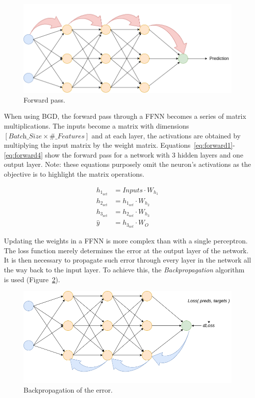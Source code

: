 \begin{figure}[!htbp]
    \centering
    \includegraphics[width=.5\textwidth]{Images/forward_pass.png}
    \caption{Forward pass.}
    \label{fig:forward}
\end{figure}

When using BGD, the forward pass through a FFNN becomes a series of matrix
multiplications. The inputs become a matrix with dimensions $[\textit{Batch\_Size} \times
\textit{\#\_Features}]$ and at each layer, the activations are obtained by multiplying
the input matrix by the weight matrix.
Equations~\ref{eq:forward1}-\ref{eq:forward4} show the forward pass for a
network with 3 hidden layers and one output layer. Note: these equations
purposely omit the neuron's activations as the objective is to highlight the
matrix operations.

\begin{align}
    h_{1_{act}} &= \textit{Inputs} \cdot W_{h_1} \label{eq:forward1}\\
    h_{2_{\textit{act}}} &= h_{1_{\textit{act}}} \cdot W_{h_2} \label{eq:forward2}\\
    h_{3_{\textit{act}}} &= h_{2_{\textit{act}}} \cdot W_{h_3} \label{eq:forward3}\\
    \hat{y} &= h_{3_{\textit{act}}} \cdot W_{O}
    \label{eq:forward4}
\end{align}

Updating the weights in a FFNN is more complex than with a single perceptron.
The loss function merely determines the error at the output layer of the
network. It is then necessary to propagate such error through every layer in the
network all the way back to the input layer. To achieve this, the
\textit{Backpropagation} algorithm is used (Figure~\ref{fig:backprop}).

\begin{figure}[!htbp]
    \centering
    \includegraphics[width=.5\textwidth]{Images/backprop.png}
    \caption{Backpropagation of the error.}
    \label{fig:backprop}
\end{figure}

